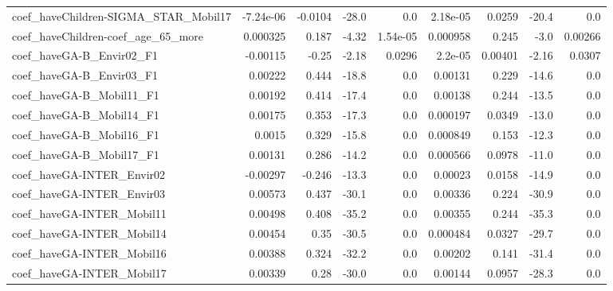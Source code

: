 \begin{tabular}{lrrrrrrrr}
coef\_haveChildren-SIGMA\_STAR\_Mobil17      &   -7.24e-06 &      -0.0104 &   -28.0 &      0.0 &   2.18e-05 &      0.0259 &        -20.4 &           0.0 \\
coef\_haveChildren-coef\_age\_65\_more        &    0.000325 &        0.187 &   -4.32 & 1.54e-05 &   0.000958 &       0.245 &         -3.0 &       0.00266 \\
coef\_haveGA-B\_Envir02\_F1                  &    -0.00115 &        -0.25 &   -2.18 &   0.0296 &    2.2e-05 &     0.00401 &        -2.16 &        0.0307 \\
coef\_haveGA-B\_Envir03\_F1                  &     0.00222 &        0.444 &   -18.8 &      0.0 &    0.00131 &       0.229 &        -14.6 &           0.0 \\
coef\_haveGA-B\_Mobil11\_F1                  &     0.00192 &        0.414 &   -17.4 &      0.0 &    0.00138 &       0.244 &        -13.5 &           0.0 \\
coef\_haveGA-B\_Mobil14\_F1                  &     0.00175 &        0.353 &   -17.3 &      0.0 &   0.000197 &      0.0349 &        -13.0 &           0.0 \\
coef\_haveGA-B\_Mobil16\_F1                  &      0.0015 &        0.329 &   -15.8 &      0.0 &   0.000849 &       0.153 &        -12.3 &           0.0 \\
coef\_haveGA-B\_Mobil17\_F1                  &     0.00131 &        0.286 &   -14.2 &      0.0 &   0.000566 &      0.0978 &        -11.0 &           0.0 \\
coef\_haveGA-INTER\_Envir02                 &    -0.00297 &       -0.246 &   -13.3 &      0.0 &    0.00023 &      0.0158 &        -14.9 &           0.0 \\
coef\_haveGA-INTER\_Envir03                 &     0.00573 &        0.437 &   -30.1 &      0.0 &    0.00336 &       0.224 &        -30.9 &           0.0 \\
coef\_haveGA-INTER\_Mobil11                 &     0.00498 &        0.408 &   -35.2 &      0.0 &    0.00355 &       0.244 &        -35.3 &           0.0 \\
coef\_haveGA-INTER\_Mobil14                 &     0.00454 &         0.35 &   -30.5 &      0.0 &   0.000484 &      0.0327 &        -29.7 &           0.0 \\
coef\_haveGA-INTER\_Mobil16                 &     0.00388 &        0.324 &   -32.2 &      0.0 &    0.00202 &       0.141 &        -31.4 &           0.0 \\
coef\_haveGA-INTER\_Mobil17                 &     0.00339 &         0.28 &   -30.0 &      0.0 &    0.00144 &      0.0957 &        -28.3 &           0.0 \\

\end{tabular}
